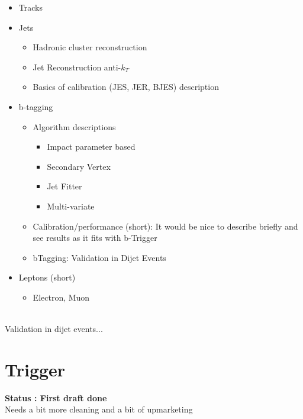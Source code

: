 \begin{itemize}

\item{Tracks}

\item{Jets}
  \begin{itemize}[label={$-$}]
  \item{Hadronic cluster reconstruction}
  \item{Jet Reconstruction anti-$k_T$}
  \item{Basics of calibration (JES, JER, BJES) description}
  \end{itemize}
  
\item{b-tagging}  
  \begin{itemize}[label={$-$}]
  \item{Algorithm descriptions}
    \begin{itemize}[label={$+$}]
    \item{Impact parameter based}
    \item{Secondary Vertex}
    \item{Jet Fitter}
    \item{Multi-variate}
    \end{itemize}
  \item{Calibration/performance (short): It would be nice to describe briefly and see results as it fits with b-Trigger}
  \item{bTagging: Validation in Dijet Events}
  \end{itemize}

\item{Leptons (short)}
  \begin{itemize}[label={$-$}]
  \item{Electron, Muon}
  \end{itemize}
\end{itemize}

  \noindent\\
  Validation in dijet events...\\
  

  \newpage
\section{Trigger}

\textbf{Status : First draft done}\\
\noindent
Needs a bit more cleaning and a bit of upmarketing



